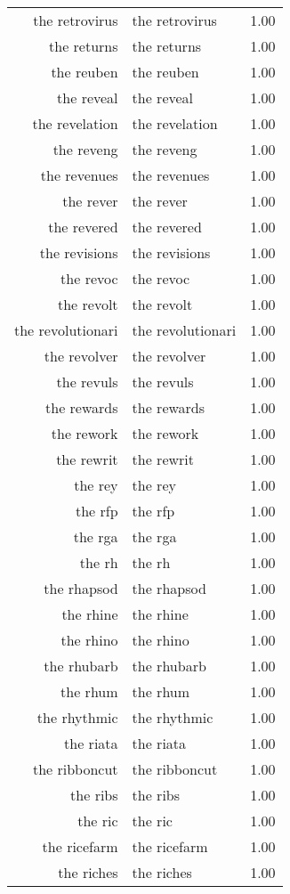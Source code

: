 \begin{table}[ht]
\begin{tabular}{rlr}
  the retrovirus & the retrovirus & 1.00 \\ 
  the returns & the returns & 1.00 \\ 
  the reuben & the reuben & 1.00 \\ 
  the reveal & the reveal & 1.00 \\ 
  the revelation & the revelation & 1.00 \\ 
  the reveng & the reveng & 1.00 \\ 
  the revenues & the revenues & 1.00 \\ 
  the rever & the rever & 1.00 \\ 
  the revered & the revered & 1.00 \\ 
  the revisions & the revisions & 1.00 \\ 
  the revoc & the revoc & 1.00 \\ 
  the revolt & the revolt & 1.00 \\ 
  the revolutionari & the revolutionari & 1.00 \\ 
  the revolver & the revolver & 1.00 \\ 
  the revuls & the revuls & 1.00 \\ 
  the rewards & the rewards & 1.00 \\ 
  the rework & the rework & 1.00 \\ 
  the rewrit & the rewrit & 1.00 \\ 
  the rey & the rey & 1.00 \\ 
  the rfp & the rfp & 1.00 \\ 
  the rga & the rga & 1.00 \\ 
  the rh & the rh & 1.00 \\ 
  the rhapsod & the rhapsod & 1.00 \\ 
  the rhine & the rhine & 1.00 \\ 
  the rhino & the rhino & 1.00 \\ 
  the rhubarb & the rhubarb & 1.00 \\ 
  the rhum & the rhum & 1.00 \\ 
  the rhythmic & the rhythmic & 1.00 \\ 
  the riata & the riata & 1.00 \\ 
  the ribboncut & the ribboncut & 1.00 \\ 
  the ribs & the ribs & 1.00 \\ 
  the ric & the ric & 1.00 \\ 
  the ricefarm & the ricefarm & 1.00 \\ 
  the riches & the riches & 1.00 \\ 

\end{tabular}
\end{table}
